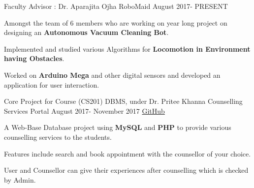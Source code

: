 \begin{cventries}
  \cventry
    {\small Faculty Advisor : Dr. Aparajita Ojha}
    {\small RoboMaid}
    {\small August 2017- PRESENT}
    {}
    {
      \begin{cvitems}\small
        \item {Amongst the team of 6 members who are working on year long project on designing an \textbf{Autonomous Vacuum Cleaning Bot}.}
        \item {Implemented and studied various Algorithms for \textbf{Locomotion in Environment having Obstacles}.}
        \item {Worked on \textbf{Arduino Mega} and other digital sensors and developed an application for user interaction.}
      \end{cvitems}
    }
\end{cventries}
\begin{cventries}
  \cventry
    {\small Core Project for Course (CS201) DBMS, under Dr. Pritee Khanna}
    {\small Counselling Services Portal}
    {\small August 2017- November 2017}
    {\small \href{https://goo.gl/ftZFww}{GitHub}}
    {
      \begin{cvitems}\small
        \item {A Web-Base Database project using \textbf{MySQL} and \textbf{PHP} to provide various counselling services to the students.}
        \item {Features include search and book appointment with the counsellor of your choice.}
        \item {User and Counsellor can give their experiences after counselling which is checked by Admin.}
      \end{cvitems}
    }
\end{cventries}
